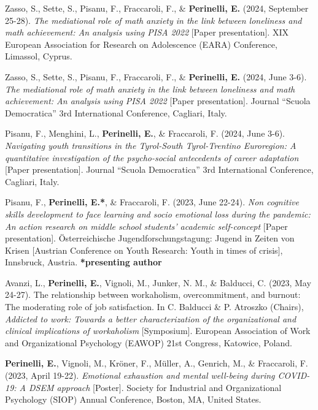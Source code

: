 \documentclass[hidelinks, letterpaper,10pt]{article} %
\begin{document}
\begin{etaremune}
	
	\item Zasso, S., Sette, S., Pisanu, F., Fraccaroli, F., \& \textbf{Perinelli, E.} (2024, September 25-28). \textit{The mediational role of math anxiety in the link between loneliness and math achievement: An analysis using PISA 2022} [Paper presentation]. XIX European Association for Research on Adolescence (EARA) Conference, Limassol, Cyprus.
		
	\item Zasso, S., Sette, S., Pisanu, F., Fraccaroli, F., \& \textbf{Perinelli, E.} (2024, June 3-6). \textit{The mediational role of math anxiety in the link between loneliness and math achievement: An analysis using PISA 2022} [Paper presentation]. Journal “Scuola Democratica” 3rd International Conference, Cagliari, Italy.

	\item Pisanu, F., Menghini, L., \textbf{Perinelli, E.}, \& Fraccaroli, F. (2024, June 3-6). \textit{Navigating youth transitions in the Tyrol-South Tyrol-Trentino Euroregion: A quantitative investigation of the psycho-social antecedents of career adaptation} [Paper presentation]. Journal “Scuola Democratica” 3rd International Conference, Cagliari, Italy.

	\item Pisanu, F., \textbf{Perinelli, E.*}, \& Fraccaroli, F. (2023, June 22-24). \textit{Non cognitive skills development to face learning and socio emotional loss during the pandemic: An action research on middle school students' academic self-concept} [Paper presentation]. Österreichische Jugendforschungstagung: Jugend in Zeiten von Krisen [Austrian Conference on Youth Research: Youth in times of crisis], Innsbruck, Austria. \textbf{*presenting author}

	\item Avanzi, L., \textbf{Perinelli, E.}, Vignoli, M., Junker, N. M., \& Balducci, C. (2023, May 24-27). The relationship between workaholism, overcommitment, and burnout: The moderating role of job satisfaction. In C. Balducci \& P. Atroszko (Chairs), \textit{Addicted to work: Towards a better characterization of the organizational and clinical implications of workaholism} [Symposium]. European Association of Work and Organizational Psychology (EAWOP) 21st Congress, Katowice, Poland.

	\item \textbf{Perinelli, E.}, Vignoli, M., Kröner, F., Müller, A., Genrich, M., \& Fraccaroli, F. (2023, April 19-22). \textit{Emotional exhaustion and mental well-being during COVID-19: A DSEM approach} [Poster]. Society for Industrial and Organizational Psychology (SIOP) Annual Conference, Boston, MA, United States.


\end{etaremune}
\end{document}
